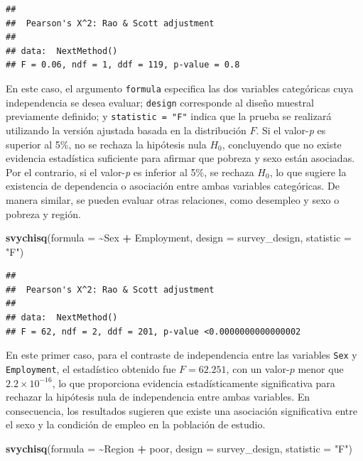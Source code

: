 \documentclass[
  spanish,
  12pt,
]{book}
\newenvironment{Shaded}{\begin{snugshade}}{\end{snugshade}}
\newcommand{\AttributeTok}[1]{\textcolor[rgb]{0.13,0.29,0.53}{#1}}
\newcommand{\FunctionTok}[1]{\textcolor[rgb]{0.13,0.29,0.53}{\textbf{#1}}}
\newcommand{\NormalTok}[1]{#1}
\newcommand{\SpecialCharTok}[1]{\textcolor[rgb]{0.81,0.36,0.00}{\textbf{#1}}}
\newcommand{\StringTok}[1]{\textcolor[rgb]{0.31,0.60,0.02}{#1}}
\begin{document}
\begin{verbatim}
## 
##  Pearson's X^2: Rao & Scott adjustment
## 
## data:  NextMethod()
## F = 0.06, ndf = 1, ddf = 119, p-value = 0.8
\end{verbatim}

En este caso, el argumento \texttt{formula} especifica las dos variables categóricas cuya independencia se desea evaluar; \texttt{design} corresponde al diseño muestral previamente definido; y \texttt{statistic\ =\ "F"} indica que la prueba se realizará utilizando la versión ajustada basada en la distribución \(F\). Si el valor-\emph{p} es superior al 5\%, no se rechaza la hipótesis nula \(H_0\), concluyendo que no existe evidencia estadística suficiente para afirmar que pobreza y sexo están asociadas. Por el contrario, si el valor-\emph{p} es inferior al 5\%, se rechaza \(H_0\), lo que sugiere la existencia de dependencia o asociación entre ambas variables categóricas. De manera similar, se pueden evaluar otras relaciones, como desempleo y sexo o pobreza y región.

\begin{Shaded}
\begin{Highlighting}[]
\FunctionTok{svychisq}\NormalTok{(}\AttributeTok{formula =} \SpecialCharTok{\textasciitilde{}}\NormalTok{Sex }\SpecialCharTok{+}\NormalTok{ Employment, }\AttributeTok{design =}\NormalTok{ survey\_design, }\AttributeTok{statistic =} \StringTok{"F"}\NormalTok{)}
\end{Highlighting}
\end{Shaded}

\begin{verbatim}
## 
##  Pearson's X^2: Rao & Scott adjustment
## 
## data:  NextMethod()
## F = 62, ndf = 2, ddf = 201, p-value <0.0000000000000002
\end{verbatim}

En este primer caso, para el contraste de independencia entre las variables \texttt{Sex} y \texttt{Employment}, el estadístico obtenido fue \(F = 62.251\), con un valor-\(p\) menor que \(2.2\times10^{-16}\), lo que proporciona evidencia estadísticamente significativa para rechazar la hipótesis nula de independencia entre ambas variables. En consecuencia, los resultados sugieren que existe una asociación significativa entre el sexo y la condición de empleo en la población de estudio.

\begin{Shaded}
\begin{Highlighting}[]
\FunctionTok{svychisq}\NormalTok{(}\AttributeTok{formula =} \SpecialCharTok{\textasciitilde{}}\NormalTok{Region }\SpecialCharTok{+}\NormalTok{ poor, }\AttributeTok{design =}\NormalTok{ survey\_design, }\AttributeTok{statistic =} \StringTok{"F"}\NormalTok{)}
\end{Highlighting}
\end{Shaded}
\end{document}
